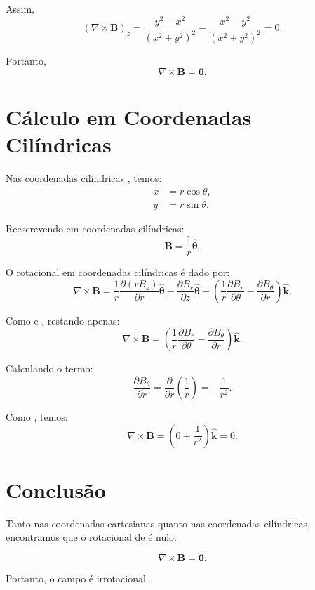 \documentclass[a4paper,12pt]{article}
\begin{document}
\begin{flushleft}
Assim,
\begin{equation}
\left(\nabla \times \mathbf{B} \right)_z = \frac{y^2 - x^2}{(x^2 + y^2)^2} - \frac{x^2 - y^2}{(x^2 + y^2)^2} = 0.
\end{equation}

Portanto,
\begin{equation}
\boxed{ \nabla \times \mathbf{B} = \mathbf{0}.}
\end{equation}

\section*{Cálculo em Coordenadas Cilíndricas}

Nas coordenadas cilíndricas , temos:
\begin{align}
x &= r \cos\theta, \\
y &= r \sin\theta.
\end{align}

Reescrevendo  em coordenadas cilíndricas:
\begin{equation}
\mathbf{B} = \frac{1}{r} \hat{\bm{\theta}}.
\end{equation}

O rotacional em coordenadas cilíndricas é dado por:
\begin{equation}
\nabla \times \mathbf{B} = \frac{1}{r} \frac{\partial (r B_z)}{\partial r} \hat{\bm{\theta}} - \frac{\partial B_r}{\partial z} \hat{\bm{\theta}} + \left( \frac{1}{r} \frac{\partial B_r}{\partial \theta} - \frac{\partial B_\theta}{\partial r} \right) \hat{\mathbf{k}}.
\end{equation}

Como  e , restando apenas:
\begin{equation}
\nabla \times \mathbf{B} = \left( \frac{1}{r} \frac{\partial B_r}{\partial \theta} - \frac{\partial B_\theta}{\partial r} \right) \hat{\mathbf{k}}.
\end{equation}

Calculando o termo:
\begin{equation}
\frac{\partial B_\theta}{\partial r} = \frac{\partial}{\partial r} \left( \frac{1}{r} \right) = -\frac{1}{r^2}.
\end{equation}

Como , temos:
\begin{equation}
\nabla \times \mathbf{B} = \left( 0 + \frac{1}{r^2} \right) \hat{\mathbf{k}} = 0.
\end{equation}

\section*{Conclusão}

Tanto nas coordenadas cartesianas quanto nas coordenadas cilíndricas, encontramos que o rotacional de  é nulo:

\begin{equation}
\nabla \times \mathbf{B} = \mathbf{0}.
\end{equation}

Portanto, o campo é irrotacional.

\end{flushleft}
    
\end{document}
